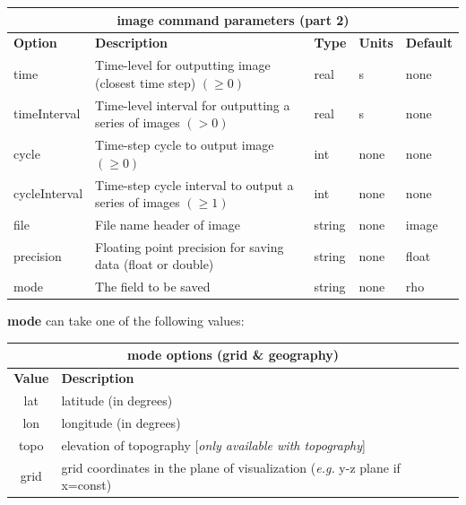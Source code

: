 \documentclass[11pt]{report}
\begin{document}
\begin{center}
\begin{tabular}{|l|p{8cm}|l|l|l|} \hline
\multicolumn{5}{|c|}{\bf image command parameters (part 2)}\\ \hline
\bf{Option} & \bf{Description}                             & \bf{Type} & \bf{Units} & \bf{Default} \\ 
\hline \hline
time          & Time-level for outputting image (closest time step) $(\geq 0)$ & real  & s    & none \\ \hline
timeInterval  & Time-level interval for outputting a series of images $(> 0)$  & real  & s    & none \\ \hline
cycle         & Time-step cycle to output image $(\geq 0)$                     & int    & none & none \\ \hline
cycleInterval & Time-step cycle interval to output a series of images $(\geq 1)$ & int    & none & none \\ \hline\hline
file          & File name header of image                                   & string & none & image \\ \hline
precision     & Floating point precision for saving data (float or double)  & string & none & float \\ \hline
mode          & The field to be saved                                       & string & none & rho \\ \hline
\end{tabular}
\end{center}
%
{\bf mode} can take one of the following values:
%
\begin{center}
\begin{tabular}{|c|l|} \hline
\multicolumn{2}{|c|}{\bf mode options (grid \& geography)}\\ \hline
\bf{Value} & \bf{Description} \\ 
\hline  \hline
lat     & latitude (in degrees)  \\ \hline
lon     & longitude (in degrees) \\ \hline
topo    & elevation of topography [\emph{only available with topography}]\\ \hline
grid    & grid coordinates in the plane of visualization (\emph{e.g.} y-z plane if x=const) \\ \hline
\end{tabular}
\end{center}
\end{document}
